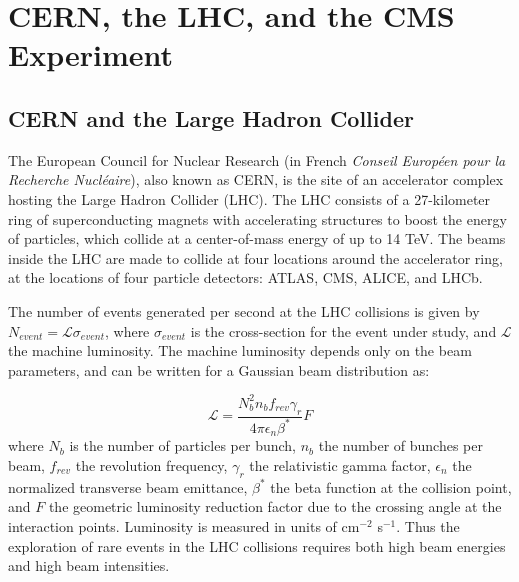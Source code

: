 \documentclass{article}
\begin{document}
\section{CERN, the LHC, and the CMS Experiment}

\subsection{CERN and the Large Hadron Collider}
The European Council for Nuclear Research (in French \textit{Conseil Europ\'{e}en pour la Recherche Nucl\'{e}aire}), also known as CERN, is the site of an accelerator complex hosting the Large Hadron Collider (LHC). The LHC consists of a 27-kilometer ring of superconducting magnets with accelerating structures to boost the energy of particles, which collide at a center-of-mass energy of up to 14 TeV. The beams inside the LHC are made to collide at four locations around the accelerator ring, at the locations of four particle detectors: ATLAS, CMS, ALICE, and LHCb.

The number of events generated per second at the LHC collisions is given by $N_{event} = \mathcal{L} \sigma_{event}$, where $\sigma_{event}$ is the cross-section for the event under study, and $\mathcal{L}$ the machine luminosity. The machine luminosity depends only on the beam parameters, and can be written for a Gaussian beam distribution as:

\begin{equation}
    \mathcal{L} = \frac{N_b^2 n_b f_{rev} \gamma_r}{4\pi \epsilon_n \beta^*} F
\end{equation}
where $N_b$ is the number of particles per bunch, $n_b$ the number of bunches per beam, $f_{rev}$ the revolution frequency, $\gamma_r$ the relativistic gamma factor, $\epsilon_n$ the normalized transverse beam emittance, $\beta^*$ the beta function at the collision point, and $F$ the geometric luminosity reduction factor due to the crossing angle at the interaction points. Luminosity is measured in units of cm$^{-2}$ s$^{-1}$. Thus the exploration of rare events in the LHC collisions requires both high beam energies and high beam intensities.
\end{document}
